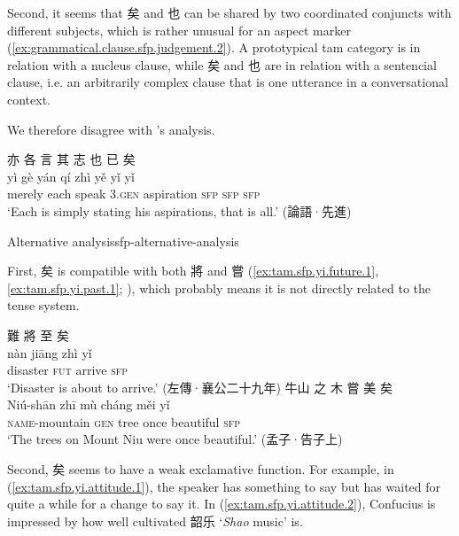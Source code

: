 \documentclass[UTF8, a4paper, oneside, scheme=plain, 12pt]{ctexrep}
\newcommand{\form}[1]{\emph{#1}}
\newcommand{\translate}[1]{`#1'}
\newcommand*{\category}[1]{\textsc{#1}}
\begin{document}
Second, it seems that 矣 and 也 can be shared by two coordinated conjuncts with different subjects,
which is rather unusual for an aspect marker (\ref{ex:grammatical.clause.sfp.judgement.2}).
A prototypical \ac{tam} category is in relation with a nucleus clause,
while 矣 and 也 are in relation with a sentencial clause,
i.e. an arbitrarily complex clause that is one utterance in a conversational context.


We therefore disagree with \citet{meiguang2018}'s analysis.



\begin{exe}
    \ex
    \glll 亦 各 言 其 志 也 已 矣 \\
    yì gè yán qí zhì yě yǐ yǐ \\
    merely each speak 3.\category{gen} aspiration \category{sfp} \category{sfp} \category{sfp} \\
    \glt\translate{Each is simply stating his aspirations, that is all.} \hfill (論語·先進)
\end{exe}

\begin{infobox}{Alternative analysis}{sfp-alternative-analysis}
    
\end{infobox}

First, 矣 is compatible with both 將 and 嘗 (\ref{ex:tam.sfp.yi.future.1}, \ref{ex:tam.sfp.yi.past.1}; ), which probably means it is not directly related to the tense system.

\begin{exe}
    \ex\label{ex:tam.sfp.yi.future.1}
    \glll 難 將 至 矣 \\
    nàn jiāng zhì yǐ \\
    disaster \category{fut} arrive \category{sfp} \\
    \glt\translate{Disaster is about to arrive.} \hfill (左傳·襄公二十九年)
    \ex\label{ex:tam.sfp.yi.past.1}
    \glll 牛山 之 木 嘗 美 矣 \\
    Niú-shān zhī mù cháng měi yǐ \\
    \category{name}-mountain \category{gen} tree once beautiful \category{sfp} \\
    \glt\translate{The trees on Mount Niu were once beautiful.} \hfill (孟子·告子上)
\end{exe}

Second, 矣 seems to have a weak exclamative function.
For example, in (\ref{ex:tam.sfp.yi.attitude.1}),
the speaker has something to say but has waited for quite a while for a change to say it.
In (\ref{ex:tam.sfp.yi.attitude.2}),
Confucius is impressed by how well cultivated 韶乐 \translate{\form{Shao} music} is.
\end{document}
